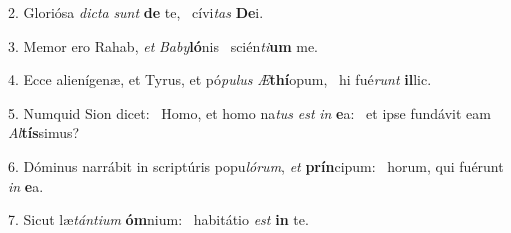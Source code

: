 2. Gloriósa \textit{dic}\textit{ta} \textit{sunt} \textbf{de} te, \ast\  cívi\textit{tas} \textbf{De}i.\

3. Memor ero Rahab, \textit{et} \textit{Ba}\textit{by}\textbf{ló}nis \ast\  scién\textit{ti}\textbf{um} me.\

4. Ecce alienígenæ, et Tyrus, et pó\textit{pu}\textit{lus} \textit{Æ}\textbf{thí}opum, \ast\  hi fué\textit{runt} \textbf{il}lic.\

5. Numquid Sion dicet: \dag\  Homo, et homo na\textit{tus} \textit{est} \textit{in} \textbf{e}a: \ast\  et ipse fundávit eam \textit{Al}\textbf{tís}simus?\

6. Dóminus narrábit in scriptúris popu\textit{ló}\textit{rum}, \textit{et} \textbf{prín}cipum: \ast\  horum, qui fuérunt \textit{in} \textbf{e}a.\

7. Sicut læ\textit{tán}\textit{ti}\textit{um} \textbf{óm}nium: \ast\  habitátio \textit{est} \textbf{in} te.\


